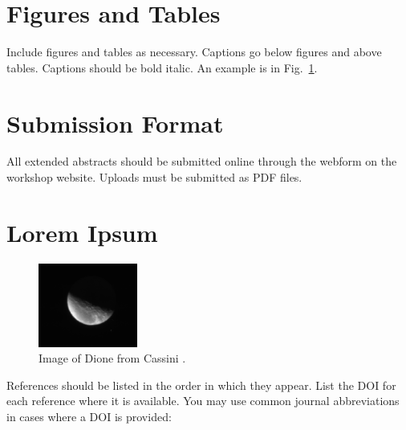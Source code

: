 \documentclass{RPI-SIW}
\begin{document}
\section*{Figures and Tables}
Include figures and tables as necessary.  Captions go below figures and above tables.  Captions should be bold italic. An example is in Fig.~\ref{figs::dione}.

\section*{Submission Format}
All extended abstracts should be submitted online through the webform on the workshop website. Uploads must be submitted as PDF files.

\section*{Lorem Ipsum}
\lipsum[1-2]

\begin{figure}[h]
	\centering
	\includegraphics[width=0.29\textwidth]{figs/Dione.png}
	\caption{Image of Dione from Cassini \cite{porco2005}.}
	\label{figs::dione}
\end{figure}

\lipsum[3-3]

References should be listed in the order in which they appear. List the DOI for each reference where it is available. You may use common journal abbreviations in cases where a DOI is provided: 

\vspace{3pt}

\titleformat{\section}[runin]{\normalsize\bfseries}{\thesection}{0em}{\addperiod}
{\footnotesize }
\end{document}

